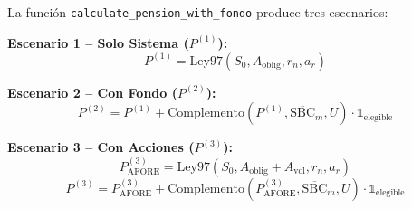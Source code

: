 \documentclass[11pt,a4paper]{report}
\theoremstyle{remark}
\begin{document}
\begin{tcolorbox}[colback=blue!5!white, colframe=blue!75!black, title=\textbf{Definici\'on Formal}]
La funci\'on \texttt{calculate\_pension\_with\_fondo} produce tres escenarios:

\textbf{Escenario 1 -- Solo Sistema ($P^{(1)}$):}
\begin{equation}
P^{(1)} = \text{Ley97}(S_0, A_{\text{oblig}}, r_n, a_r)
\end{equation}

\textbf{Escenario 2 -- Con Fondo ($P^{(2)}$):}
\begin{equation}
P^{(2)} = P^{(1)} + \text{Complemento}(P^{(1)}, \overline{\text{SBC}}_m, U) \cdot \mathbb{1}_{\text{elegible}}
\end{equation}

\textbf{Escenario 3 -- Con Acciones ($P^{(3)}$):}
\begin{equation}
P^{(3)}_{\text{AFORE}} = \text{Ley97}(S_0, A_{\text{oblig}} + A_{\text{vol}}, r_n, a_r)
\end{equation}
\begin{equation}
P^{(3)} = P^{(3)}_{\text{AFORE}} + \text{Complemento}(P^{(3)}_{\text{AFORE}}, \overline{\text{SBC}}_m, U) \cdot \mathbb{1}_{\text{elegible}}
\end{equation}
\end{tcolorbox}
\end{document}
